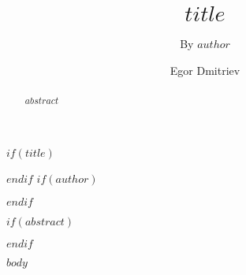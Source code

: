 \documentclass[acmsmall,nonacm]{acmart}
\begin{document}
$if(title)$
\title{$title$}
$endif$
$if(author)$
\subtitle{By $author$}
$endif$


\author{Egor Dmitriev}


$if(abstract)$
\begin{abstract}
$abstract$
\end{abstract}
$endif$

\maketitle

\renewcommand{\shortauthors}{$author.name$}




$body$
\end{document}
